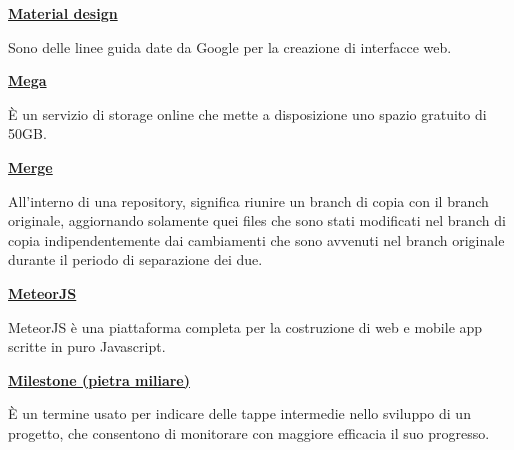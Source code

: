 \bigskip
\begin{addmargin}[0em]{0em}	
	\textbf{\underline{Material design}}
\end{addmargin}
	
\medskip
\begin{addmargin}[5em]{1em}
Sono delle linee guida date da Google per la creazione di interfacce web.	
\end{addmargin}	

\bigskip
\begin{addmargin}[0em]{0em}	
	\textbf{\underline{Mega}} 
\end{addmargin}
	
\medskip
\begin{addmargin}[5em]{1em}
È un servizio di storage online che mette a disposizione uno spazio gratuito di 50GB. 
\end{addmargin}	

\bigskip
\begin{addmargin}[0em]{0em}	
	\textbf{\underline{Merge}} 
\end{addmargin}

\medskip
\begin{addmargin}[5em]{1em}	
All'interno di una repository, significa riunire un branch di copia con il branch originale, aggiornando solamente quei files che sono stati modificati nel branch di copia indipendentemente
dai cambiamenti che sono avvenuti nel branch originale durante il periodo di separazione dei due.
\end{addmargin}

\bigskip
\begin{addmargin}[0em]{0em}	
	\textbf{\underline{MeteorJS}} 
\end{addmargin}

\medskip
\begin{addmargin}[5em]{1em}	
MeteorJS è una piattaforma completa per la costruzione di web e mobile app scritte in puro Javascript.
\end{addmargin}

\bigskip
\begin{addmargin}[0em]{0em}	
	\textbf{\underline{Milestone (pietra miliare)}} 
\end{addmargin}
	
\medskip
\begin{addmargin}[5em]{1em}	
È un termine usato per indicare delle tappe intermedie nello sviluppo di un progetto, che consentono di monitorare con maggiore efficacia il suo progresso.
\end{addmargin}	

